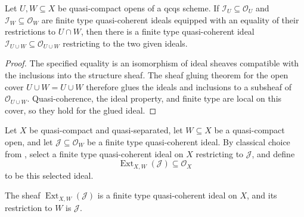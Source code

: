 \begin{lemma}
  \label{lemma:nagata-glue-finite-type-ideals}

  Let $U,W\subseteq X$ be quasi-compact opens of a qcqs scheme.  If
  $\mathcal I_U\subseteq\mathcal O_U$ and
  $\mathcal I_W\subseteq\mathcal O_W$ are finite type quasi-coherent ideals
  equipped with an equality of their restrictions to $U\cap W$, then there is
  a finite type quasi-coherent ideal
  $\mathcal I_{U\cup W}\subseteq\mathcal O_{U\cup W}$ restricting to the two
  given ideals.
\end{lemma}

\begin{proof}
  The specified equality is an isomorphism of ideal sheaves compatible with
  the inclusions into the structure sheaf.  The sheaf gluing theorem for the
  open cover $U\cup W=U\cup W$ therefore glues the ideals and inclusions to a
  subsheaf of $\mathcal O_{U\cup W}$.  Quasi-coherence, the ideal property,
  and finite type are local on this cover, so they hold for the glued ideal.
\end{proof}

\begin{definition}
  \label{def:nagata-finite-type-ideal-extension}

  Let $X$ be quasi-compact and quasi-separated, let $W\subseteq X$ be a
  quasi-compact open, and let
  $\mathcal J\subseteq\mathcal O_W$ be a finite type quasi-coherent ideal.
  By classical choice from
  , select a finite type
  quasi-coherent ideal on $X$ restricting to $\mathcal J$, and define
  \[
    \operatorname{Ext}_{X,W}(\mathcal J)\subseteq\mathcal O_X
  \]
  to be this selected ideal.
\end{definition}

\begin{lemma}
  \label{lemma:nagata-extend-finite-type-ideal}

  The sheaf $\operatorname{Ext}_{X,W}(\mathcal J)$ is a finite type
  quasi-coherent ideal on $X$, and its restriction to $W$ is
  $\mathcal J$.
\end{lemma}

